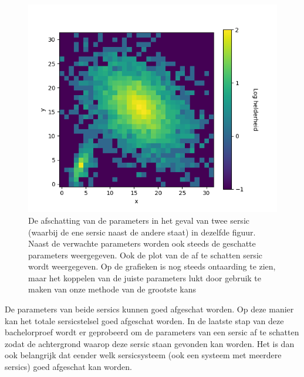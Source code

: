 \begin{figure}
\begin{minipage}{0.98\linewidth}
        \includegraphics[width=0.95\linewidth]
        {Figures/figuur_2D_zonder_package_5000.png}
    \end{minipage}
    \caption{De afschatting van de parameters in het geval van twee sersic (waarbij de ene sersic naast de andere staat) in dezelfde figuur. Naast de verwachte parameters worden ook steeds de geschatte parameters weergegeven. Ook de plot van de af te schatten sersic wordt weergegeven. Op de grafieken is nog steeds ontaarding te zien, maar het koppelen van de juiste parameters lukt door gebruik te maken van onze methode van de grootste kans}
    \label{fig: 2 sersic niet ontaard}
\end{figure}
De parameters van beide sersics kunnen goed afgeschat worden. Op deze manier kan het totale sersicstelsel goed afgeschat worden. In de laatste stap van deze bachelorproef wordt er geprobeerd om de parameters van een sersic af te schatten zodat de achtergrond waarop deze sersic staan gevonden kan worden. Het is dan ook belangrijk dat eender welk sersicsysteem (ook een systeem met meerdere sersics) goed afgeschat kan worden.

